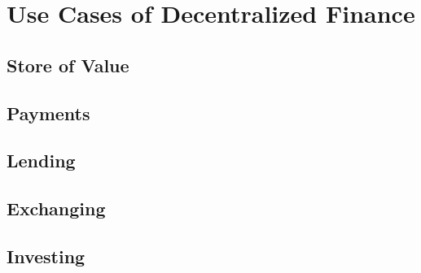 \chapter{Use Cases of Decentralized Finance}
\label{cha:UseCasesDecentralizedFinance}

\section{Store of Value}
\section{Payments}
\section{Lending}
\section{Exchanging}
\section{Investing}